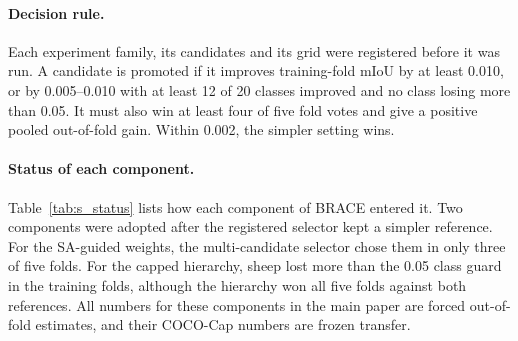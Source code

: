 \documentclass[10pt,twocolumn,letterpaper]{article}
\begin{document}
\paragraph{Decision rule.}
Each experiment family, its candidates and its grid were registered before it was run. A candidate is promoted if it improves training-fold mIoU by at least 0.010, or by 0.005--0.010 with at least 12 of 20 classes improved and no class losing more than 0.05. It must also win at least four of five fold votes and give a positive pooled out-of-fold gain. Within 0.002, the simpler setting wins.

\paragraph{Status of each component.}
Table~\ref{tab:s_status} lists how each component of BRACE entered it. Two components were adopted after the registered selector kept a simpler reference. For the SA-guided weights, the multi-candidate selector chose them in only three of five folds. For the capped hierarchy, sheep lost more than the 0.05 class guard in the training folds, although the hierarchy won all five folds against both references. All numbers for these components in the main paper are forced out-of-fold estimates, and their COCO-Cap numbers are frozen transfer.
\end{document}
